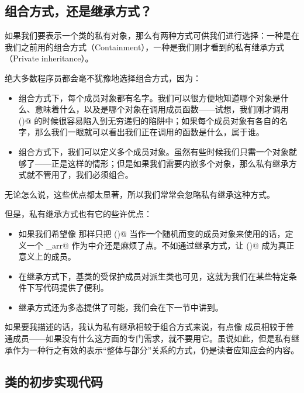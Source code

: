 \subsection*{组合方式，还是继承方式？}
如果我们要表示一个类的私有对象，那么有两种方式可供我们进行选择：一种是在我们之前用的组合方式（Containment），一种是我们刚才看到的私有继承方式（Private inheritance）。\par
绝大多数程序员都会毫不犹豫地选择组合方式，因为：
\begin{itemize}
    \item 组合方式下，每个成员对象都有名字。我们可以很方便地知道哪个对象是什么、意味着什么，以及是哪个对象在调用成员函数——试想，我们刚才调用 \lstinline@size()@ 的时候很容易陷入到无穷递归的陷阱中；如果每个成员对象有各自的名字，那么我们一眼就可以看出我们正在调用的函数是什么，属于谁。
    \item 组合方式下，我们可以定义多个成员对象。虽然有些时候我们只需一个对象就够了——\lstinline@stack@ 正是这样的情形；但是如果我们需要内嵌多个对象，那么私有继承方式就不管用了，我们必须组合。
\end{itemize}
无论怎么说，这些优点都太显著，所以我们常常会忽略私有继承这种方式。\par
但是，私有继承方式也有它的些许优点：
\begin{itemize}
    \item 如果我们希望像 \lstinline@Arr@ 那样只把 \lstinline@p()@ 当作一个随机而变的成员对象来使用的话，定义一个 \lstinline@_arr@ 作为中介还是麻烦了点。不如通过继承方式，让 \lstinline@p()@ 成为真正意义上的成员。
    \item 在继承方式下，基类的受保护成员对派生类也可见，这就为我们在某些特定条件下写代码提供了便利。
    \item 继承方式还为多态提供了可能，我们会在下一节中讲到。
\end{itemize}\par
如果要我描述的话，我认为私有继承相较于组合方式来说，有点像 \lstinline@mutable@ 成员相较于普通成员——如果没有什么这方面的专门需求，就不要用它。虽说如此，但是私有继承作为一种行之有效的表示``整体与部分''关系的方式，仍是读者应知应会的内容。\par
\subsection*{\lstinline@stack@ 类的初步实现代码}


